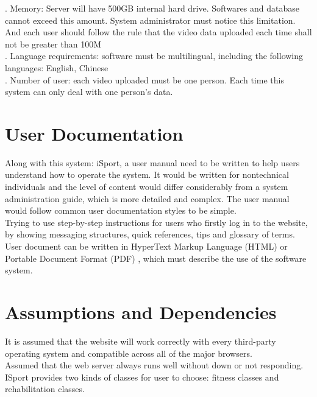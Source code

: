 \documentclass[16pt]{scrreprt}
\begin{document}
 
. Memory: Server will have 500GB internal hard drive. Softwares and database cannot exceed this amount. System administrator must notice this limitation. And each user should follow the rule that the video data uploaded each time shall not be greater than 100M\\

 
. Language requirements: software must be multilingual, including the following languages: English, Chinese\\

 
. Number of user: each video uploaded must be one person. Each time this system can only deal with one person's data.\\

 
\section{User Documentation}

 
Along with this system: iSport, a user manual need to be written to help users understand how to operate the system. It would be written for nontechnical individuals and the level of content would differ considerably from a system administration guide, which is more detailed and complex. The user manual would follow common user documentation styles to be simple.\\

 
Trying to use step-by-step instructions for users who firstly log in to the website, by showing messaging structures, quick references, tips and glossary of terms.\\

 
User document can be written in HyperText Markup Language (HTML) or Portable Document Format (PDF) , which must describe the use of the software system.

 
\section{Assumptions and Dependencies}

 
It is assumed that the website will work correctly with every third-party operating
system and compatible across all of the major browsers.\\

 
Assumed that the web server always runs well without down or not responding.\\

 
ISport provides two kinds of classes for user to choose: fitness classes and rehabilitation classes.\\
\end{document}
